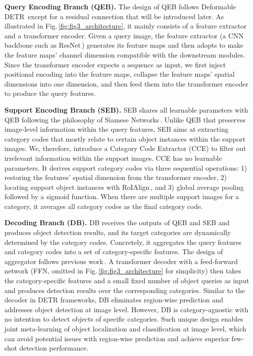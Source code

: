 \documentclass[10pt,twocolumn,letterpaper]{article}
\begin{document}
\medskip
\noindent
\textbf{Query Encoding Branch (QEB).}
The design of QEB follows Deformable DETR\,\cite{DeformableDETR} except for a residual connection that will be introduced later. As illustrated in Fig.\,\ref{fig:fig3_architecture}, it mainly consists of a feature extractor and a transformer encoder. Given a query image, the feature extractor (a CNN backbone such as ResNet\,\cite{resnet}) generates its feature maps and then adopts  to make the feature maps' channel dimension compatible with the downstream modules. Since the transformer encoder expects a sequence as input, we first inject positional encoding into the feature maps, collapse the feature maps' spatial dimensions into one dimension, and then feed them into the transformer encoder to produce the query features.

\medskip
\noindent
\textbf{Support Encoding Branch (SEB).}
SEB shares all learnable parameters with QEB following the philosophy of Siamese Networks\,\cite{SiameseOneshotImageRecognition}. Unlike QEB that preserves image-level information within the query features, SEB aims at extracting category codes that mostly relate to certain object instances within the support images. We, therefore, introduce a Category Code Extractor (CCE) to filter out irrelevant information within the support images. CCE has no learnable parameters. It derives support category codes via three sequential operations: 1) restoring the features' spatial dimension from the transformer encoder, 2) locating support object instances with RoIAlign\,\cite{MaskRCNN}, and 3) global average pooling followed by a sigmoid function. When there are multiple support images for a category, it averages all category codes as the final category code.

\medskip
\noindent
\textbf{Decoding Branch (DB).}
DB receives the outputs of QEB and SEB and produces object detection results, and its target categories are dynamically determined by the category codes. Concretely, it aggregates the query features and category codes into a set of category-specific features. The design of aggregator follows previous work\,\cite{FSDetView}. A transformer decoder with a feed-forward network (FFN, omitted in Fig.\,\ref{fig:fig3_architecture} for simplicity) then takes the category-specific features and a small fixed number of object queries as input and produces detection results over the corresponding categories. Similar to the decoder in DETR frameworks, DB eliminates region-wise prediction and addresses object detection at image level. However, DB is category-agnostic with no intention to detect objects of specific categories. Such unique design enables joint meta-learning of object localization and classification at image level, which can avoid potential issues with region-wise prediction and achieve superior few-shot detection performance.
\end{document}
